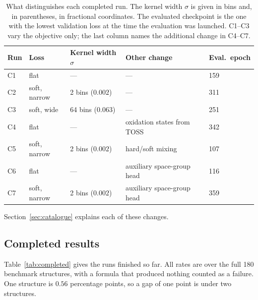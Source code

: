 \documentclass[manuscript,screen,review]{acmart}
\begin{document}
\begin{table}[h]
  \caption{What distinguishes each completed run. The kernel width $\sigma$ is
  given in bins and, in parentheses, in fractional coordinates. The evaluated
  checkpoint is the one with the lowest validation loss at the time the
  evaluation was launched. C1--C3 vary the objective only; the last column names
  the additional change in C4--C7.}
  \label{tab:changes}
  \begin{footnotesize}
  \begin{tabular}{lllp{2.1cm}l}
    \toprule
    Run & Loss & Kernel width $\sigma$ & Other change & Eval.\ epoch \\
    \midrule
    C1 & flat          & ---                 & ---                       & 159 \\
    C2 & soft, narrow  & 2 bins ($0.002$)    & ---                       & 311 \\
    C3 & soft, wide    & 64 bins ($0.063$)   & ---                       & 251 \\
    C4 & flat          & ---                 & oxidation states from TOSS & 342 \\
    C5 & soft, narrow  & 2 bins ($0.002$)    & hard/soft mixing          & 107 \\
    C6 & flat          & ---                 & auxiliary space-group head & 116 \\
    C7 & soft, narrow  & 2 bins ($0.002$)    & auxiliary space-group head & 359 \\
    \bottomrule
  \end{tabular}
  \end{footnotesize}
\end{table}

Section~\ref{sec:catalogue} explains each of these changes.

\subsection{Completed results}
\label{sec:completed}

Table~\ref{tab:completed} gives the runs finished so far. All rates are over
the full 180 benchmark structures, with a formula that produced nothing counted
as a failure. One structure is $0.56$ percentage points, so a gap of one point
is under two structures.
\end{document}
